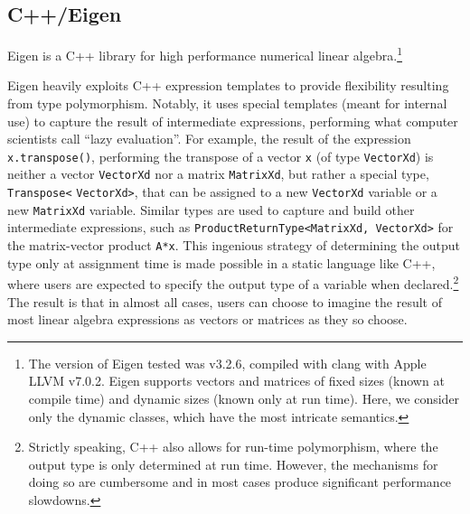 \subsection{C++/Eigen}

Eigen is a C++ library for high performance numerical linear algebra.\cite{eigenweb}\footnote{The version of Eigen tested was v3.2.6, compiled with clang with Apple
LLVM v7.0.2. Eigen supports vectors and matrices of fixed sizes (known
at compile time) and dynamic sizes (known only at run time). Here,
we consider only the dynamic classes, which have the most intricate
semantics. }

Eigen heavily exploits C++ expression templates to provide flexibility
resulting from type polymorphism. Notably, it uses special templates
(meant for internal use) to capture the result of intermediate expressions,
performing what computer scientists call ``lazy evaluation''. For
example, the result of the expression \verb`x.transpose()`, performing
the transpose of a vector \verb`x` (of type \verb`VectorXd`) is
neither a vector \verb`VectorXd` nor a matrix \verb`MatrixXd`, but
rather a special type, \verb`Transpose<` \verb`VectorXd>`, that
can be assigned to a new \verb`VectorXd` variable or a new \verb`MatrixXd`
variable. Similar types are used to capture and build other intermediate
expressions, such as \verb`ProductReturnType<MatrixXd, VectorXd>`
for the matrix-vector product \verb`A*x`. This ingenious strategy
of determining the output type only at assignment time is made possible
in a static language like C++, where users are expected to specify
the output type of a variable when declared.\footnote{Strictly speaking, C++ also allows for run-time polymorphism, where
the output type is only determined at run time. However, the mechanisms
for doing so are cumbersome and in most cases produce significant
performance slowdowns.} The result is that in almost all cases, users can choose to imagine
the result of most linear algebra expressions as vectors or matrices
as they so choose.

